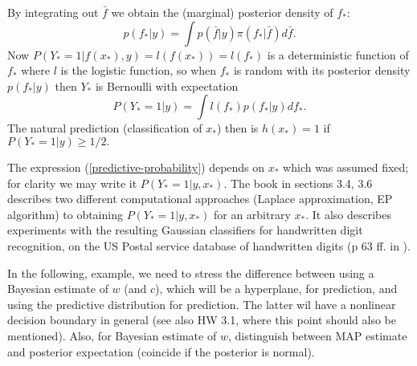 \documentclass[11pt,twoside]{article}%
\theoremstyle{change}
\newenvironment{quote-env}{\begin{quote}\sffamily }{\end{quote}}
\newenvironment{mycomments-env}[1][Mycomments]{\textbf{#1.} \begin{quote-env} }{ \end{quote-env}  \ \rule{0.5em}{0.5em}}
\begin{document}
\bigskip\bigskip By integrating out $\bar{f}$ we obtain the (marginal)
posterior density of $f_{\ast}$:%
\[
p\left(  f_{\ast}|y\right)  =\int p\left(  \bar{f}|y\right)  \pi(f_{\ast}%
|\bar{f})d\bar{f}.
\]
Now $P\left(  Y_{\ast}=1|f(x_{\ast}),y\right)  =l\left(  f(x_{\ast})\right)
=l\left(  f_{\ast}\right)  $ is a deterministic function of $f_{\ast}$ where
$l$ is the logistic function, so when $f_{\ast}$ is random with its posterior
density $p\left(  f_{\ast}|y\right)  $ then $Y_{\ast}$ is Bernoulli with
expectation
\begin{equation}
P\left(  Y_{\ast}=1|y\right)  =\int l\left(  f_{\ast}\right)  p\left(
f_{\ast}|y\right)  df_{\ast}.\label{predictive-probability}%
\end{equation}
The natural prediction (classification of $x_{\ast}$) then is $h(x_{\ast})=1$
if $P\left(  Y_{\ast}=1|y\right)  \geq1/2.$

The expression (\ref{predictive-probability}) depends on $x_{\ast}$ which was
assumed fixed; for clarity we may write it $P\left(  Y_{\ast}=1|y,x_{\ast
}\right)  $. The book \cite{RW} in sections 3.4, 3.6 describes two different
computational approaches (Laplace approximation, EP algorithm) to obtaining
$P\left(  Y_{\ast}=1|y,x_{\ast}\right)  $ for an arbitrary $x_{\ast}$. It also
describes experiments with the resulting Gaussian classifiers for handwritten
digit recognition, on the US Postal service database of handwritten digits (p
63 ff. in \cite{RW}).

\bigskip\bigskip%
\begin{mycomments}%


\begin{mycomments-env}
In the following, example, we need to stress the difference between using a
Bayesian estimate of $w$ (and $c$), which will be a hyperplane, for
prediction, and using the predictive distribution for prediction. The latter
wil have a nonlinear decision boundary in general (see also HW 3.1, where this
point should also be mentioned). Also, for Bayesian estimate of $w$,
distinguish between MAP estimate and posterior expectation (coincide if the
posterior is normal).
\end{mycomments-env}%

\end{mycomments}%
\end{document}
